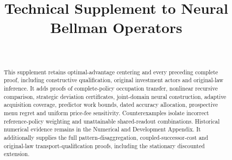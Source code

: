 \documentclass[ecta,nameyear,draft]{econsocart}
\begin{document}
\begin{frontmatter}
\title{Technical Supplement to Neural Bellman Operators}
\begin{aug}
\author[id=au1,addressref={add1}]{~}
\address[id=add1]{Peking University}
\end{aug}
\begin{abstract}
This supplement retains optimal-advantage centering and every preceding complete proof, including constructive qualification, original investment actors and original-law inference. It adds proofs of complete-policy occupation transfer, nonlinear recursive comparison, strategic deviation certificates, joint-domain neural construction, adaptive acquisition coverage, predictor work bounds, dated accuracy allocation, prospective menu regret and uniform price-fee sensitivity. Counterexamples isolate incorrect reference-policy weighting and unattainable shared-readout combinations. Historical numerical evidence remains in the Numerical and Development Appendix.
 It additionally supplies the full pattern-disaggregation, coupled-successor-cost and original-law transport-qualification proofs, including the stationary discounted extension.
\end{abstract}
\end{frontmatter}











\end{document}

